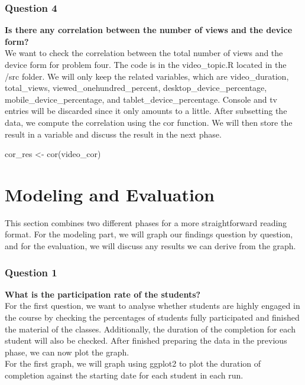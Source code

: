 \documentclass[12pt,]{article}
\newenvironment{Shaded}{\begin{snugshade}}{\end{snugshade}}
\newcommand{\FunctionTok}[1]{\textcolor[rgb]{0.00,0.00,0.00}{#1}}
\newcommand{\NormalTok}[1]{#1}
\newcommand{\OtherTok}[1]{\textcolor[rgb]{0.56,0.35,0.01}{#1}}
\begin{document}
\hypertarget{question-4}{%
\subsubsection{Question 4}\label{question-4}}

\textbf{Is there any correlation between the number of views and the
device form?}\\
\hfill\break We want to check the correlation between the total number
of views and the device form for problem four. The code is in the
video\_topic.R located in the /src folder. We will only keep the related
variables, which are video\_duration, total\_views,
viewed\_onehundred\_percent, desktop\_device\_percentage,
mobile\_device\_percentage, and tablet\_device\_percentage. Console and
tv entries will be discarded since it only amounts to a little. After
subsetting the data, we compute the correlation using the cor function.
We will then store the result in a variable and discuss the result in
the next phase.

\begin{Shaded}
\begin{Highlighting}[]
\NormalTok{cor\_res }\OtherTok{\textless{}{-}} \FunctionTok{cor}\NormalTok{(video\_cor)}
\end{Highlighting}
\end{Shaded}

\hypertarget{modeling-and-evaluation}{%
\section{Modeling and Evaluation}\label{modeling-and-evaluation}}

This section combines two different phases for a more straightforward
reading format. For the modeling part, we will graph our findings
question by question, and for the evaluation, we will discuss any
results we can derive from the graph.

\hypertarget{question-1-1}{%
\subsubsection{Question 1}\label{question-1-1}}

\textbf{What is the participation rate of the students?}\\
\hfill\break For the first question, we want to analyse whether students
are highly engaged in the course by checking the percentages of students
fully participated and finished the material of the classes.
Additionally, the duration of the completion for each student will also
be checked. After finished preparing the data in the previous phase, we
can now plot the graph.\\
\hfill\break For the first graph, we will graph using ggplot2 to plot
the duration of completion against the starting date for each student in
each run.
\end{document}
